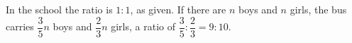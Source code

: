 In the school the ratio is $\boxed{1:1}$, as given. If there are $n$ boys and $n$ girls, the bus carries $\dfrac35n$ boys and $\dfrac23n$ girls, a ratio of $\dfrac35:\dfrac23=\boxed{9:10}$.
